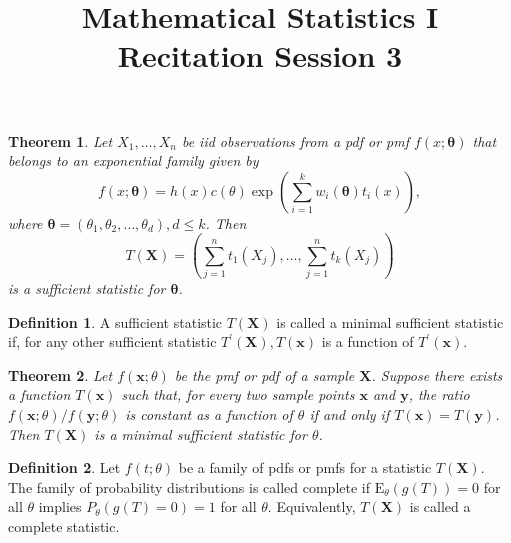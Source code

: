 \documentclass{article}
\title{Mathematical Statistics I\\ Recitation Session 3}
\date{}
\newtheorem*{theorem*}{Theorem}
\theoremstyle{definition}
\newtheorem*{definition*}{Definition}
\begin{document}
	\maketitle
	\begin{theorem*}
		Let $X_1, \ldots, X_n$ be iid observations from a pdf or pmf $f(x;\boldsymbol{\theta})$ that belongs to an exponential family given by
		$$
		f(x;\boldsymbol{\theta})=h(x) c(\theta) \exp \left(\sum_{i=1}^k w_i(\boldsymbol{\theta}) t_i(x)\right),
		$$
		where $\boldsymbol{\theta}=\left(\theta_1, \theta_2, \ldots, \theta_d\right), d \leq k$. Then
		$$
		T(\mathbf{X})=\left(\sum_{j=1}^n t_1\left(X_j\right), \ldots, \sum_{j=1}^n t_k\left(X_j\right)\right)
		$$
		is a sufficient statistic for $\boldsymbol{\theta}$.
	\end{theorem*}
	\begin{definition*}
	A sufficient statistic $T(\mathbf{X})$ is called a minimal sufficient statistic if, for any other sufficient statistic $T^{\prime}(\mathbf{X}), T(\mathbf{x})$ is a function of $T^{\prime}(\mathbf{x})$.
	\end{definition*}
	
	\begin{theorem*}
		Let $f(\mathbf{x};\theta)$ be the pmf or pdf of a sample $\mathbf{X}$. Suppose there exists a function $T(\mathbf{x})$ such that, for every two sample points $\mathbf{x}$ and $\mathbf{y}$, the ratio $f(\mathbf{x} ;\theta) / f(\mathbf{y};\theta)$ is constant as a function of $\theta$ if and only if $T(\mathbf{x})=T(\mathbf{y})$. Then $T(\mathbf{X})$ is a minimal sufficient statistic for $\theta$.
	\end{theorem*}

	
	\begin{definition*}
		 Let $f(t;\theta)$ be a family of pdfs or pmfs for a statistic $T(\mathbf{X})$. The family of probability distributions is called complete if $\mathrm{E}_\theta \left(g(T)\right)=0$ for all $\theta$ implies $P_\theta(g(T)=0)=1$ for all $\theta$. Equivalently, $T(\mathbf{X})$ is called a complete statistic.
	\end{definition*}
	
\end{document}
